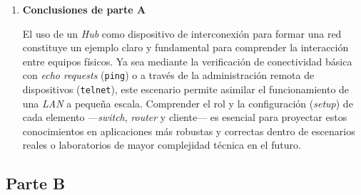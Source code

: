 \begin{enumerate}[resume=labsteps]
Realizar estas pruebas de conexión es fundamental, ya que permiten 
al administrador confirmar múltiples aspectos de la red de manera 
simultánea. No solo validan que el direccionamiento \textit{IP} y la 
configuración de seguridad sean correctos, sino que, primordialmente, 
verifican el flujo de datos y la funcionalidad de los servicios; es decir, 
la interacción real entre los dispositivos. En este escenario, aunque el 
\textit{Hub} es un equipo sencillo, resulta crucial comprobar que cumple 
su función replicando la información de manera íntegra y manteniendo un 
tráfico eficaz en la red.

\paragraph{¿Cuál es el propósito y utilidad de realizar estas pruebas de conectividad 
por red y de Telnet?}


\item \textbf{Conclusiones de parte A}

El uso de un \textit{Hub} como dispositivo de interconexión para formar una 
red constituye un ejemplo claro y fundamental para comprender la interacción 
entre equipos físicos. Ya sea mediante la verificación de conectividad básica
 con \textit{echo requests} (\texttt{ping}) o a través de la administración remota 
 de dispositivos (\texttt{telnet}), este escenario permite asimilar el funcionamiento 
 de una \textit{LAN} a pequeña escala. Comprender el rol y la configuración (\textit{setup}) 
 de cada elemento —\textit{switch}, \textit{router} y cliente— es esencial para proyectar 
 estos conocimientos en aplicaciones más robustas y correctas dentro de escenarios reales o 
 laboratorios de mayor complejidad técnica en el futuro.


\end{enumerate}


\subsection*{Parte B}

